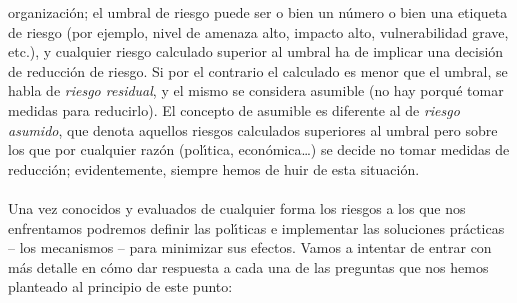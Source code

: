 organizaci\'on; el umbral de riesgo puede ser o bien un n\'umero o bien una
etiqueta de riesgo (por ejemplo, nivel de amenaza alto, impacto alto, 
vulnerabilidad grave, etc.), y cualquier riesgo calculado superior al umbral
ha de implicar una decisi\'on de reducci\'on de riesgo. Si por el contrario el
calculado es menor que el umbral, se habla de {\it riesgo residual}, y el
mismo se considera asumible (no hay porqu\'e tomar medidas para reducirlo). El
concepto de asumible es diferente al de {\it riesgo asumido}, que denota 
aquellos riesgos calculados superiores al umbral pero sobre los que por 
cualquier raz\'on (pol\'{\i}tica, econ\'omica\ldots) se decide no tomar medidas 
de reducci\'on; evidentemente, siempre hemos de huir de esta situaci\'on.\\
\\Una vez conocidos y evaluados de cualquier forma los riesgos a los que nos 
enfrentamos podremos definir las pol\'{\i}ticas e 
implementar las soluciones pr\'acticas -- los mecanismos -- para minimizar sus
efectos. Vamos a intentar de entrar con m\'as detalle en c\'omo dar respuesta a 
cada una de las preguntas que nos hemos planteado al principio de este punto:
